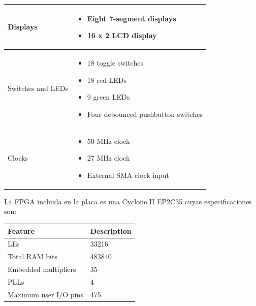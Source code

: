 \begin{center}
\begin{longtable}{|l|p{4.75in}|}
		Displays & \begin{itemize}
					\item Eight 7-segment displays
    					\item 16 x 2 LCD display
    			 \end{itemize} \\ \hline
		Switches and LEDs & \begin{itemize}
					\item 18 toggle switches
    					\item 18 red LEDs
   					\item 9 green LEDs
   		 			\item Four debounced pushbutton switches
   				     \end{itemize} \\ \hline
		Clocks & \begin{itemize}
					\item 50 MHz clock
    					\item 27 MHz clock
   					\item External SMA clock input
   			 \end{itemize}	 \\ \hline
	\end{longtable} 
\end{center}

La FPGA incluida en la placa es una Cyclone II EP2C35 cuyas especificaciones son:

\begin{center}
	\begin{longtable}{|l|p{1.75in}|} \hline
		\textbf{Feature} & \textbf{Description} \\ \hline
		LEs & 33216 \\ \hline
		Total RAM bits & 483840 \\ \hline
		Embedded multipliers & 35 \\ \hline
		PLLs & 4 \\ \hline
		Maximum user I/O pins & 475 \\ \hline
	\end{longtable}
\end{center}

